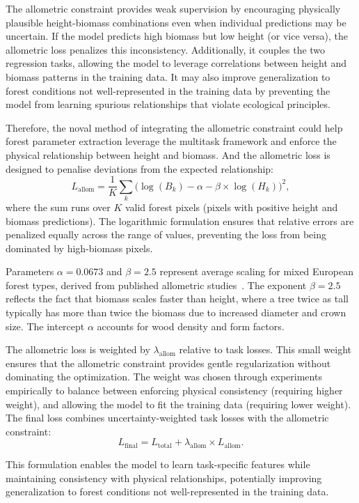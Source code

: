 The allometric constraint provides weak supervision by encouraging physically plausible height-biomass combinations even when individual predictions may be uncertain. If the model predicts high biomass but low height (or vice versa), the allometric loss penalizes this inconsistency. Additionally, it couples the two regression tasks, allowing the model to leverage correlations between height and biomass patterns in the training data. It may also improve generalization to forest conditions not well-represented in the training data by preventing the model from learning spurious relationships that violate ecological principles.

Therefore, the noval method of integrating the allometric constraint could help forest parameter extraction leverage the multitask framework and enforce the physical relationship between height and biomass. And the allometric loss is designed to penalise deviations from the expected relationship:
\begin{equation}
    L_{\text{allom}} = \frac{1}{K} \sum_k \bigl(\log(B_k) - \alpha - \beta \times \log(H_k)\bigr)^2,
\end{equation}
where the sum runs over $K$ valid forest pixels (pixels with positive height and biomass predictions). The logarithmic formulation ensures that relative errors are penalized equally across the range of values, preventing the loss from being dominated by high-biomass pixels.

Parameters $\alpha = 0.0673$ and $\beta = 2.5$ represent average scaling for mixed European forest types, derived from published allometric studies~\cite{chave_improved_2014,forrester_generalized_2017}. The exponent $\beta = 2.5$ reflects the fact that biomass scales faster than height, where a tree twice as tall typically has more than twice the biomass due to increased diameter and crown size. The intercept $\alpha$ accounts for wood density and form factors.

The allometric loss is weighted by $\lambda_{\text{allom}}$ relative to task losses. This small weight ensures that the allometric constraint provides gentle regularization without dominating the optimization. The weight was chosen through experiments empirically to balance between enforcing physical consistency (requiring higher weight), and allowing the model to fit the training data (requiring lower weight). The final loss combines uncertainty-weighted task losses with the allometric constraint:
\begin{equation}
    L_{\text{final}} = L_{\text{total}} + \lambda_{\text{allom}} \times L_{\text{allom}}.
\end{equation}

This formulation enables the model to learn task-specific features while maintaining consistency with physical relationships, potentially improving generalization to forest conditions not well-represented in the training data.
